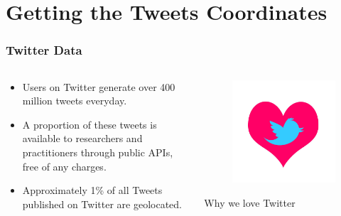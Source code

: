 \documentclass[hyperref={pdfpagelabels=true}]{beamer}
\begin{document}
\section{Getting the Tweets Coordinates} 
\begin{frame}
\frametitle{Twitter Data}

\begin{columns}
  \begin{column}{0.5\textwidth}\small{ 
    \begin{itemize}
      \item<1->Users on Twitter generate over 400 million tweets everyday.
      \item<1->A proportion of these tweets is available to researchers and practitioners through public APIs, free of any charges.
      \item<2->Approximately 1\% of all Tweets published on Twitter are geolocated.%
      \end{itemize}  }
  \end{column}
  \begin{column}{0.5\textwidth}
      \begin{figure}  
	\includegraphics[width=\textwidth]{love.jpg}\\
       \end{figure}  
    \tiny{Why we love Twitter}  
  \end{column}  
\end{columns}
\end{frame}
\end{document}
